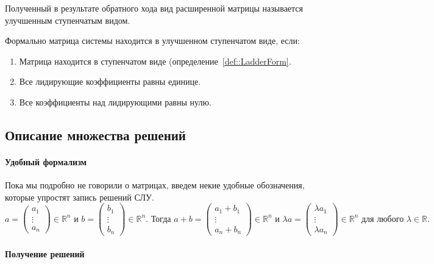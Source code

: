 Полученный в результате обратного хода вид расширенной матрицы называется улучшенным ступенчатым видом.
\begin{definition}
\label{def::RREF}
Формально матрица системы находится в улучшенном ступенчатом виде, если:
\begin{enumerate}
\item Матрица находится в ступенчатом виде (определение~\ref{def::LadderForm}.

\item Все лидирующие коэффициенты равны единице.

\item Все коэффициенты над лидирующими равны нулю.
\end{enumerate}
\end{definition}

\subsection{Описание множества решений}

\paragraph{Удобный формализм}

Пока мы подробно не говорили о матрицах, введем некие удобные обозначения, которые упростят запись решений СЛУ.
\[
a=
\begin{pmatrix}
{a_1}\\{\vdots}\\{a_n}
\end{pmatrix}
\in\mathbb R^n
\text{ и }
b=
\begin{pmatrix}
{b_1}\\{\vdots}\\{b_n}
\end{pmatrix}
\in\mathbb R^n.
\text{ Тогда }
a + b =
\begin{pmatrix}
{a_1 + b_1}\\{\vdots}\\{a_n + b_n}
\end{pmatrix}
\in\mathbb R^n
\text{ и }
\lambda a =
\begin{pmatrix}
{\lambda a_1}\\{\vdots}\\{\lambda a_n}
\end{pmatrix}
\in\mathbb R^n\text{ для любого }\lambda\in\mathbb R.
\]

\paragraph{Получение решений}

